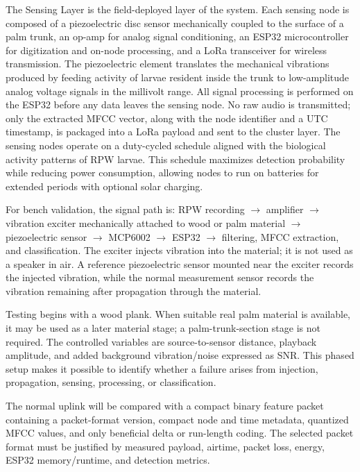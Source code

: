 \documentclass[12pt,a4paper,oneside]{memoir}
\newcommand{\newrevision}[1]{\textcolor{green!45!black}{#1}}
\begin{document}
The Sensing Layer is the field-deployed layer of the system. Each sensing node is composed of a piezoelectric disc sensor mechanically coupled to the surface of a palm trunk, an op-amp for analog signal conditioning, an ESP32 microcontroller for digitization and on-node processing, and a LoRa transceiver for wireless transmission. The piezoelectric element translates the mechanical vibrations produced by feeding activity of larvae resident inside the trunk to low-amplitude analog voltage signals in the millivolt range. All signal processing is performed on the ESP32 before any data leaves the sensing node. No raw audio is transmitted; only the extracted MFCC vector, along with the node identifier and a UTC timestamp, is packaged into a LoRa payload and sent to the cluster layer. The sensing nodes operate on a duty-cycled schedule aligned with the biological activity patterns of RPW larvae. This schedule maximizes detection probability while reducing power consumption, allowing nodes to run on batteries for extended periods with optional solar charging.

\newrevision{For bench validation, the signal path is: RPW recording $\rightarrow$ amplifier $\rightarrow$ vibration exciter mechanically attached to wood or palm material $\rightarrow$ piezoelectric sensor $\rightarrow$ MCP6002 $\rightarrow$ ESP32 $\rightarrow$ filtering, MFCC extraction, and classification. The exciter injects vibration into the material; it is not used as a speaker in air. A reference piezoelectric sensor mounted near the exciter records the injected vibration, while the normal measurement sensor records the vibration remaining after propagation through the material.}

\newrevision{Testing begins with a wood plank. When suitable real palm material is available, it may be used as a later material stage; a palm-trunk-section stage is not required. The controlled variables are source-to-sensor distance, playback amplitude, and added background vibration/noise expressed as SNR. This phased setup makes it possible to identify whether a failure arises from injection, propagation, sensing, processing, or classification.}

\newrevision{The normal uplink will be compared with a compact binary feature packet containing a packet-format version, compact node and time metadata, quantized MFCC values, and only beneficial delta or run-length coding. The selected packet format must be justified by measured payload, airtime, packet loss, energy, ESP32 memory/runtime, and detection metrics.}
\end{document}
